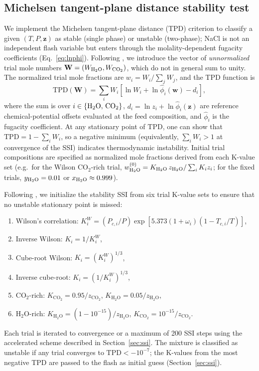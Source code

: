 \documentclass[preprint,12pt,number]{elsarticle}
\begin{document}
\subsection{Michelsen tangent-plane distance stability test}
\label{sec:stability}

We implement the Michelsen tangent-plane distance (TPD) criterion \citep{Michelsen1982a}
to classify a given $(T, P, \mathbf{z})$ as stable (single phase) or unstable (two-phase);
NaCl is not an independent flash variable but enters through the molality-dependent
fugacity coefficients (Eq.~\ref{eq:lnphi}).
Following \citet{Michelsen1982a}, we introduce the vector of
\emph{unnormalized} trial mole numbers
$\mathbf{W} = (W_{\rm H_2O}, W_{\rm CO_2})$, which do not
in general sum to unity.
The normalized trial mole fractions are $w_i = W_i / \sum_j W_j$, and
the TPD function is
\begin{equation}
  \text{TPD}(\mathbf{W}) = \sum_{i} W_i \left[\ln W_i + \ln \hat{\phi}_i(\mathbf{w}) - d_i\right],
  \label{eq:tpd}
\end{equation}
where the sum is over $i \in \{{\rm H_2O},\,{\rm CO_2}\}$,
$d_i = \ln z_i + \ln \hat{\phi}_i(\mathbf{z})$ are reference chemical-potential
offsets evaluated at the feed composition, and $\hat{\phi}_i$ is the fugacity
coefficient.
At any stationary point of $\text{TPD}$, one can show that
$\text{TPD} = 1 - \sum_i W_i$, so a negative minimum
(equivalently, $\sum_i W_i > 1$ at convergence of the SSI) indicates
thermodynamic instability.
Initial trial compositions are specified as normalized mole fractions derived
from each K-value set (e.g.\ for the Wilson CO$_2$-rich trial,
$w_{\rm H_2O}^{(0)} = K_{\rm H_2O}\,z_{\rm H_2O} / \sum_i K_i z_i$; for the fixed trials, $y_{\rm H_2O} = 0.01$ or
$x_{\rm H_2O} \approx 0.999$).

Following \citet{Jex2024}, we initialize the stability SSI from six trial K-value sets to
ensure that no unstable stationary point is missed:
\begin{enumerate}
  \item Wilson's correlation: $K_i^W = (P_{c,i}/P)\exp[5.373(1+\omega_i)(1-T_{c,i}/T)]$,
  \item Inverse Wilson: $K_i = 1/K_i^W$,
  \item Cube-root Wilson: $K_i = (K_i^W)^{1/3}$,
  \item Inverse cube-root: $K_i = (1/K_i^W)^{1/3}$,
  \item CO$_2$-rich: $K_{\text{CO}_2} = 0.95/z_{\text{CO}_2}$,
        $K_{\text{H}_2\text{O}} = 0.05/z_{\text{H}_2\text{O}}$,
  \item H$_2$O-rich: $K_{\text{H}_2\text{O}} = (1-10^{-15})/z_{\text{H}_2\text{O}}$,
        $K_{\text{CO}_2} = 10^{-15}/z_{\text{CO}_2}$.
\end{enumerate}
Each trial is iterated to convergence or a maximum of 200 SSI steps using the
accelerated scheme described in Section~\ref{sec:ssi}.
The mixture is classified as unstable if any trial converges to
$\text{TPD} < -10^{-7}$; the K-values from the most negative TPD are
passed to the flash as initial guess (Section~\ref{sec:ssi}).
\end{document}
